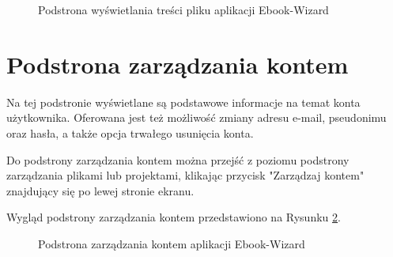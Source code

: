 \begin{figure}[h]
    \centering
    \setlength{\fboxsep}{0pt}
    \setlength{\fboxrule}{0.4pt}
    \caption{Podstrona wyświetlania treści pliku aplikacji Ebook-Wizard}
    \label{fig:page_file_display}
\end{figure}

\section{Podstrona zarządzania kontem}

Na tej podstronie wyświetlane są podstawowe informacje na temat konta użytkownika. Oferowana jest też możliwość zmiany adresu e-mail, pseudonimu oraz hasła, a także opcja trwałego usunięcia konta.

Do podstrony zarządzania kontem można przejść z poziomu podstrony zarządzania plikami lub projektami, klikając przycisk "Zarządzaj kontem" znajdujący się po lewej stronie ekranu.

Wygląd podstrony zarządzania kontem przedstawiono na Rysunku \ref{fig:page_account_mngmt}.

\begin{figure}[h]
    \centering
    \setlength{\fboxsep}{0pt}
    \setlength{\fboxrule}{0.4pt}
    \caption{Podstrona zarządzania kontem aplikacji Ebook-Wizard}
    \label{fig:page_account_mngmt}
\end{figure}

